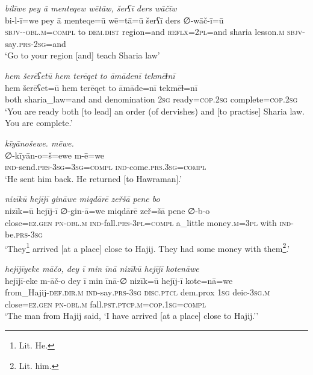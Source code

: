 \ea \label{ŽP.93}
\textit{bilīwe pey ā menteqew wētāw, šerʕī ders wāčīw} \\ 
\gll bi-l-ī=we pey ā menteqe=ū wē=tā=ū šerʕī ders ∅-wāč-ī=ū \\ 
 \textsc{sbjv-}\textsc{-obl}\textsc{.m}\textsc{=compl} to \textsc{dem.dist} region=and \textsc{reflx}=\textsc{2pl}=and sharia lesson\textsc{.m} \textsc{sbjv-}say\textsc{.prs-}\textsc{2sg}=and \\ 
\glt `Go to your region [and] teach Sharia law'
\z 
 
\ea \label{ŽP.94}
\textit{hem šerēʕetū hem terēqet to āmādenī tekmēɫnī} \\ 
\gll hem šerēʕet=ū hem terēqet to āmāde=nī tekmēɫ=nī \\ 
 both sharia\_law=and and denomination \textsc{2sg} ready\textsc{=cop}\textsc{.\textsc{2sg}} complete\textsc{=cop}\textsc{.\textsc{2sg}} \\ 
\glt `You are ready both [to lead] an order (of dervishes) and [to practise] Sharia law. You are complete.'
\z 
 
\ea \label{ŽP.96}
\textit{kīyānošewe. mēwe.} \\ 
\gll ∅-kīyān-o=š=ewe m-ē=we \\ 
 \textsc{ind-}send\textsc{.prs}\textsc{-3sg}\textsc{=3sg}\textsc{=compl} \textsc{ind-}come\textsc{.prs}\textsc{.3sg}\textsc{=compl} \\ 
\glt `He sent him back. He returned [to Hawraman].'
\z 
 
\ea \label{ŽP.101}
\textit{nizīkū hejījī gināwe miqdārē zeřšā pene bo} \\ 
\gll nizīk=ū hejīj-ī ∅-gin-ā=we miqdārē zeř=šā pene ∅-b-o \\ 
 close\textsc{\textsc{=ez.gen}} \textsc{pn}\textsc{-obl}\textsc{.m} \textsc{ind-}fall\textsc{.prs}\textsc{-3pl}\textsc{=compl} a\_little money\textsc{.m}\textsc{=3pl} with \textsc{ind-}be\textsc{.prs}\textsc{-3sg} \\ 
\glt `They\footnote{Lit. He.} arrived [at a place] close to Hajij. They had some money with them\footnote{Lit. him.}.'
\z 
 
\ea \label{ŽP.102}
\textit{hejījīyeke māčo, dey ī min īnā nizīkū hejījī kotenāwe} \\ 
\gll hejījī-eke m-āč-o dey ī min īnā-∅ nizīk=ū hejīj-ī kote=nā=we \\ 
 from\_Hajij\textsc{-def}\textsc{.dir}\textsc{.m} \textsc{ind-}say\textsc{.prs}\textsc{-3sg} \textsc{disc.ptcl} dem.prox \textsc{1sg} deic\textsc{-3sg}\textsc{.m} close\textsc{\textsc{=ez.gen}} \textsc{pn}\textsc{-obl}\textsc{.m} fall\textsc{.pst}\textsc{.ptcp}\textsc{.m}\textsc{=cop}\textsc{.\textsc{1sg}}\textsc{=compl} \\ 
\glt `The man from Hajij said, ‘I have arrived [at a place] close to Hajij.’'
\z 
 
